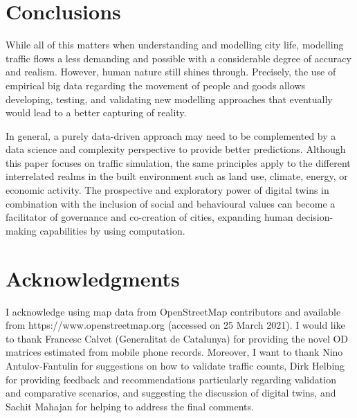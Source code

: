 \section{Conclusions}

While all of this matters when understanding and modelling city life, modelling traffic flows a less demanding and possible with a considerable degree of accuracy and realism. However, human nature still shines through. Precisely, the use of empirical big data regarding the movement of people and goods allows developing, testing, and validating new modelling approaches that eventually would lead to a better capturing of reality.

In general, a purely data-driven approach may need to be complemented by a data science and complexity perspective to provide better predictions. Although this paper focuses on traffic simulation, the same principles apply to the different interrelated realms in the built environment such as land use, climate, energy, or economic activity. The prospective and exploratory power of digital twins in combination with the inclusion of social and behavioural values can become a facilitator of governance and co-creation of cities, expanding human decision-making capabilities by using computation.




\section{Acknowledgments}
I acknowledge using map data from OpenStreetMap contributors and available from https://www.openstreetmap.org (accessed on 25 March 2021).   I would like to thank Francesc Calvet (Generalitat de Catalunya) for providing the novel OD matrices estimated from mobile phone records. Moreover, I want to thank Nino Antulov-Fantulin for suggestions on how to validate traffic counts, Dirk Helbing for providing feedback and recommendations particularly regarding validation and comparative scenarios, and suggesting the discussion of digital twins, and Sachit Mahajan for helping to address the final comments.



